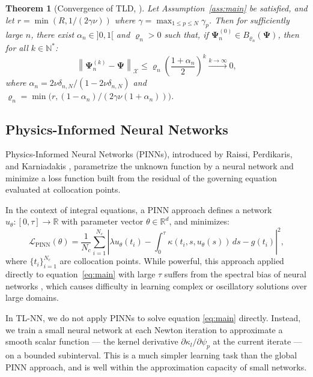 \documentclass[12pt, a4paper]{article}
\newtheorem{theorem}{Theorem}[section]
\newcommand{\norm}[1]{\left\| #1 \right\|}
\newcommand{\R}{\mathbb{R}}
\newcommand{\N}{\mathbb{N}}
\begin{document}
\begin{theorem}[Convergence of TLD, \cite{sedka2025}]
\label{thm:tld}
Let Assumption~\ref{ass:main} be satisfied, and let
$r = \min(R, 1/(2\gamma\nu))$ where
$\gamma = \max_{1 \leq p \leq N} \gamma_p$.
Then for sufficiently large $n$, there exist
$\alpha_n \in {]0,1[}$ and $\varrho_n > 0$ such that,
if $\boldsymbol{\Psi}_n^{(0)} \in B_{\varrho_n}(\boldsymbol{\Psi})$,
then for all $k \in \N^*$:
\begin{equation}
  \norm{\boldsymbol{\Psi}_n^{(k)} - \boldsymbol{\Psi}}_\mathcal{X}
  \leq \varrho_n
  \left(\frac{1 + \alpha_n}{2}\right)^k
  \xrightarrow{k \to \infty} 0,
  \label{eq:tld_conv}
\end{equation}
where
$\alpha_n = 2\nu\delta_{n,N} / (1 - 2\nu\delta_{n,N})$
and
$\varrho_n = \min\!\bigl(r, (1-\alpha_n)/(2\gamma\nu(1+\alpha_n))\bigr)$.
\end{theorem}

\subsection{Physics-Informed Neural Networks}
\label{subsec:pinn}

Physics-Informed Neural Networks (PINNs), introduced by
Raissi, Perdikaris, and Karniadakis \cite{raissi2019},
parametrize the unknown function by a neural network and
minimize a loss function built from the residual of the
governing equation evaluated at collocation points.

In the context of integral equations, a PINN approach
defines a network $u_\theta : [0, \tau] \to \R$ with
parameter vector $\theta \in \R^d$, and minimizes:
\begin{equation}
  \mathcal{L}_{\mathrm{PINN}}(\theta) =
  \frac{1}{N_c} \sum_{i=1}^{N_c}
  \left|
    \lambda u_\theta(t_i) -
    \int_0^\tau \kappa(t_i, s, u_\theta(s)) \, ds
    - g(t_i)
  \right|^2,
  \label{eq:pinn_loss}
\end{equation}
where $\{t_i\}_{i=1}^{N_c}$ are collocation points.
While powerful, this approach applied directly to
equation~\eqref{eq:main} with large $\tau$ suffers from
the spectral bias of neural networks \cite{wang2022}, which
causes difficulty in learning complex or oscillatory
solutions over large domains.

In TL-NN, we do not apply PINNs to solve equation
\eqref{eq:main} directly.
Instead, we train a small neural network at each
Newton iteration to approximate a smooth scalar function ---
the kernel derivative $\partial \kappa_l / \partial \psi_p$
at the current iterate --- on a bounded subinterval.
This is a much simpler learning task than the global PINN
approach, and is well within the approximation capacity of
small networks.
\end{document}
